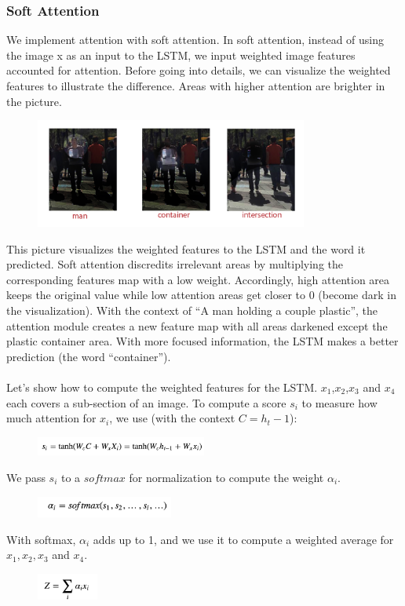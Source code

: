 \documentclass[a4paper]{article}
\begin{document}
\subsubsection{Soft Attention}
We implement attention with soft attention. In soft attention, instead of using the image x as an input to the LSTM, we input weighted image features accounted for attention. Before going into details, we can visualize the weighted features to illustrate the difference. Areas with higher attention are brighter in the picture.
\begin{figure}[H]
\centering
\includegraphics[width=0.8\textwidth]{man.png}
\end{figure}

\noindent This picture visualizes the weighted features to the LSTM and the word it predicted. Soft attention discredits irrelevant areas by multiplying the corresponding features map with a low weight. Accordingly, high attention area keeps the original value while low attention areas get closer to 0 (become dark in the visualization). With the context of “A man holding a couple plastic”, the attention module creates a new feature map with all areas darkened except the plastic container area. With more focused information, the LSTM makes a better prediction (the word “container”).\\
\\
Let’s show how to compute the weighted features for the LSTM. $x_1$,$x_2$,$x_3$ and $x_4$ each covers a sub-section of an image. To compute a score $s_i$ to measure how much attention for $x_i$, we use (with the context $C=h_t−1$):

\begin{figure}[H]
\centering
\includegraphics[width=0.5\textwidth]{8.png}
\end{figure}
\noindent We pass $s_i$ to a $softmax$ for normalization to compute the weight $\alpha_i$.
\begin{figure}[H]
\centering
\includegraphics[width=0.4\textwidth]{9.png}
\end{figure}
\noindent With softmax, $\alpha_i$ adds up to 1, and we use it to compute a weighted average for $x_1,x_2,x_3$ and $x_4$.
\begin{figure}[H]
\centering
\includegraphics[width=0.18\textwidth]{10.png}
\end{figure}
\end{document}
